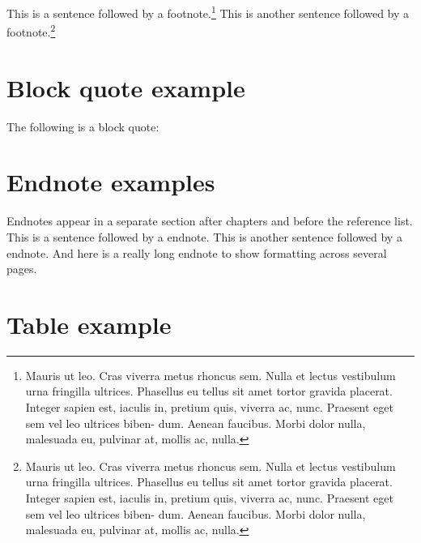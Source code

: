 This is a sentence followed by a footnote.\footnote{Mauris ut leo. Cras viverra metus rhoncus sem. Nulla et lectus vestibulum urna fringilla ultrices. Phasellus eu tellus sit amet tortor gravida placerat. Integer sapien est, iaculis in, pretium quis, viverra ac, nunc. Praesent eget sem vel leo ultrices biben- dum. Aenean faucibus. Morbi dolor nulla, malesuada eu, pulvinar at, mollis ac, nulla.} 
This is another sentence followed by a footnote.\footnote{Mauris ut leo. Cras viverra metus rhoncus sem. Nulla et lectus vestibulum urna fringilla ultrices. Phasellus eu tellus sit amet tortor gravida placerat. Integer sapien est, iaculis in, pretium quis, viverra ac, nunc. Praesent eget sem vel leo ultrices biben- dum. Aenean faucibus. Morbi dolor nulla, malesuada eu, pulvinar at, mollis ac, nulla.} 

\section{Block quote example} 

The following is a block quote: 

\begin{quote}
\lipsum[1-2]
\end{quote}

\section{Endnote examples} 

Endnotes appear in a separate section after chapters and before the reference list. 
This is a sentence followed by a endnote. 
This is another sentence followed by a endnote. 
And here is a really long endnote to show formatting across several pages.\pagenote{\expandafter\lipsum[1-6]}

\section{Table example} 

